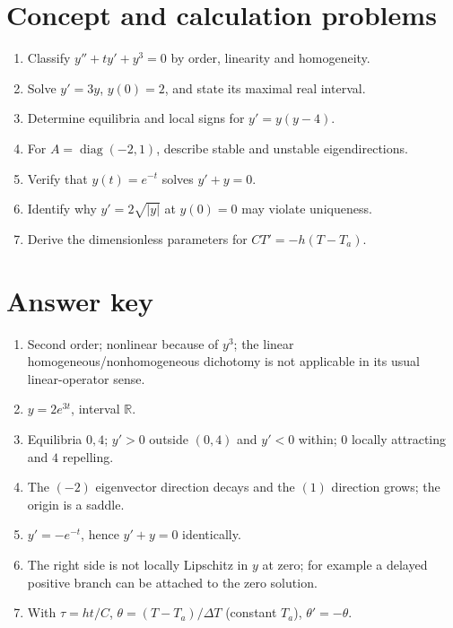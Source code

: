 \documentclass[11pt,letterpaper,oneside]{report}
\theoremstyle{definition}\newtheorem{definition}[theorem]{Definition}
\theoremstyle{remark}\newtheorem{remark}[theorem]{Remark}
\newcommand{\R}{\mathbb{R}}
\newcommand{\abs}[1]{\left\lvert#1\right\rvert}
\begin{document}
\section{Concept and calculation problems}
\begin{enumerate}
\item Classify $y''+t y'+y^3=0$ by order, linearity and homogeneity.
\item Solve $y'=3y$, $y(0)=2$, and state its maximal real interval.
\item Determine equilibria and local signs for $y'=y(y-4)$.
\item For $A=\operatorname{diag}(-2,1)$, describe stable and unstable eigendirections.
\item Verify that $y(t)=e^{-t}$ solves $y'+y=0$.
\item Identify why $y'=2\sqrt{\abs y}$ at $y(0)=0$ may violate uniqueness.
\item Derive the dimensionless parameters for $C T'=-h(T-T_a)$.
\end{enumerate}
\section{Answer key}
\begin{enumerate}
\item Second order; nonlinear because of $y^3$; the linear homogeneous/nonhomogeneous dichotomy is not applicable in its usual linear-operator sense.
\item $y=2e^{3t}$, interval $\R$.
\item Equilibria $0,4$; $y'>0$ outside $(0,4)$ and $y'<0$ within; $0$ locally attracting and $4$ repelling.
\item The $(-2)$ eigenvector direction decays and the $(1)$ direction grows; the origin is a saddle.
\item $y'=-e^{-t}$, hence $y'+y=0$ identically.
\item The right side is not locally Lipschitz in $y$ at zero; for example a delayed positive branch can be attached to the zero solution.
\item With $\tau=ht/C$, $\theta=(T-T_a)/\Delta T$ (constant $T_a$), $\theta'=-\theta$.
\end{enumerate}

\appendix
\end{document}
